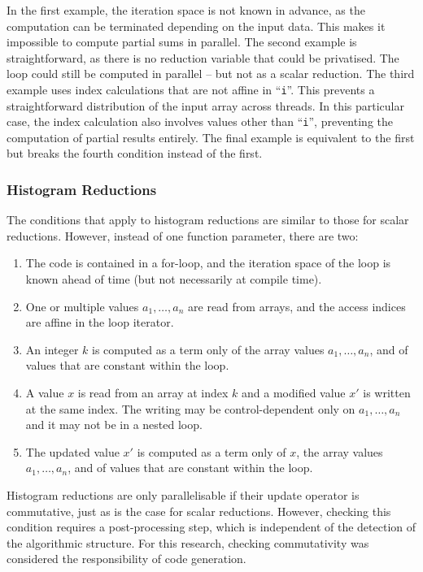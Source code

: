     In the first example, the iteration space is not known in advance, as the
    computation can be terminated depending on the input data.
    This makes it impossible to compute partial sums in parallel.
    The second example is straightforward, as there is no reduction variable
    that could be privatised.
    The loop could still be computed in parallel -- but not as a scalar
    reduction.
    The third example uses index calculations that are not affine in
    ``\texttt{i}''.
    This prevents a straightforward distribution of the input array across
    threads.
    In this particular case, the index calculation also involves values other
    than ``\texttt{i}'', preventing the computation of partial results entirely.
    The final example is equivalent to the first but breaks the fourth condition
    instead of the first.

\subsubsection{Histogram Reductions}
\label{section:histocond}

    The conditions that apply to histogram reductions are similar to those for
    scalar reductions.
    However, instead of one function parameter, there are two:
    \begin{enumerate}
        \item The code is contained in a for-loop, and the iteration space of
              the loop is known ahead of time
              (but not necessarily at compile time).
        \item One or multiple values $a_1,\dots,a_n$ are read from arrays, and
              the access indices are affine in the loop iterator.
        \item An integer $k$ is computed as a term only of the array values
              $a_1,\dots,a_n$, and of values that are constant within the loop.
        \item A value $x$ is read from an array at index $k$ and a
              modified value $x'$ is written at the same index.
              The writing may be control-dependent only on $a_1,\dots,a_n$ and
              it may not be in a nested loop.
        \item The updated value $x'$ is computed as a term only of $x$, the
              array values $a_1,\dots,a_n$, and of values that are constant
              within the loop.
    \end{enumerate}

    Histogram reductions are only parallelisable if their update operator is
    commutative, just as is the case for scalar reductions.
    However, checking this condition requires a post-processing step,
    which is independent of the detection of the algorithmic structure.
    For this research, checking commutativity was considered the responsibility
    of code generation.

